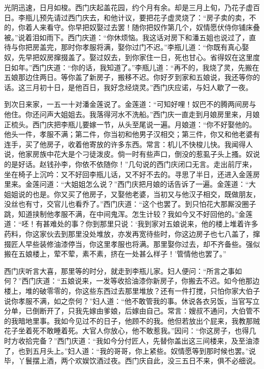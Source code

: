 光阴迅速，日月如梭。西门庆起盖花园，约个月有余。却是三月上旬，乃花子虚百日。李瓶儿预先请过西门庆去，和他计议，要把花子虚灵烧了：“房子卖的卖，不的，你着人来看守。你早把奴娶过去罢！随你把奴作第几个，奴情愿伏侍你铺床叠被。”说着泪如雨下。西门庆道：“你休烦恼。我这话对房下和潘五姐也说过了，直待与你把房盖完，那时你孝服将满，娶你过门不迟。”李瓶儿道：“你既有真心娶奴，先早把奴房撺掇盖了。娶过奴去，到你家住一日，死也甘心。省得奴在这里度日如年。”西门庆道：“你的话，我知道了。”李瓶儿道：“再不的，我烧了灵，先搬在五娘那边住两日。等你盖了新房子，搬移不迟。你好歹到家和五娘说，我还等你的话。这三月初十日，是他百日，我好念经烧灵。”西门庆应诺，与妇人歇了一夜。

到次日来家，一五一十对潘金莲说了。金莲道：“可知好哩！奴巴不的腾两间房与他住。你还问声大姐姐去。我落得河水不洗船。”西门庆一直走到月娘房里来，月娘正梳头。西门庆把李瓶儿要嫁一节，从头至尾说一遍。月娘道：“你不好娶他的。他头一件，孝服不满；第二件，你当初和他男子汉相交；第三件，你又和他老婆有连手，买了他房子，收着他寄放的许多东西。常言：机儿不快梭儿快。我闻得人说，他家房族中花大是个刁徒泼皮。倘一时有些声口，倒没的惹虱子头上搔。奴说的是好话。赵钱孙李，你依不依随你！”几句说的西门庆闭口无言。走出前厅来，坐在椅子上沉吟：又不好回李瓶儿话，又不好不去的。寻思了半日，还进入金莲房里来。金莲问道：“大姐姐怎么说？”西门庆把月娘的话告诉了一遍。金莲道：“大姐姐说的也是。你又买了他房子，又娶他老婆，当初又与他汉子相交，既做朋友，没丝也有寸，交官儿也看乔了。”西门庆道：“这个也罢了。到只怕花大那厮没圈子跳，知道挟制他孝服不满，在中间鬼浑。怎生计较？我如今又不好回他的。”金莲道：“呸！有甚难处的事？你到那里只说：‘我到家对五娘说来，他的楼上堆着许多药料，你这家伙去到那里没处堆放，亦发再宽待些时，你这边房子也七八盖了，撺掇匠人早些装修油漆停当，你这里孝服也将满。那里娶你过去，却不齐备些。强似搬在五娘楼上，荤不荤，素不素，挤在一处甚么样子！’管情他也罢了。”

西门庆听言大喜，那里等的时分，就走到李瓶儿家。妇人便问：“所言之事如何？”西门庆道：“五娘说来，一发等收拾油漆你新房子，你搬去不迟。如今他那边楼上，堆的破零零的，你这些东西过去那里堆放？还有一件打搅，只怕你家大伯子说你孝服不满，如之奈何？”妇人道：“他不敢管我的事。休说各衣另饭，当官写立分单，已倒断开了，只我先嫁由爹娘，后嫁由自己。常言：嫂叔不通问，大伯管不的我暗地里事。我如今见过不的日子，他顾不的我。他但若放出个屁来，我教那贼花子坐着死不敢睡着死。大官人你放心，他不敢惹我。”因问：“你这房子，也得几时方收拾完备？”西门庆道：“我如今分付匠人，先替你盖出这三间楼来，及至油漆了，也到五月头上。”妇人道：“我的哥哥，你上紧些。奴情愿等到那时候也罢。”说毕，丫鬟摆上酒，两个欢娱饮酒过夜。西门庆自此，没三五日不来，俱不必细说。

